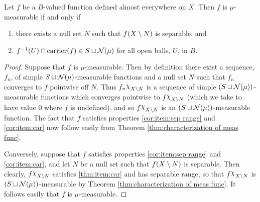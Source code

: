 \begin{corollary}
\label{cor:characterization of meas func}
Let $f$ be a $B$-valued function defined almost everywhere on $X$. Then $f$ is $\mu$-measurable if and only if
\begin{enumerate}[label=\arabic*),ref=\arabic*)]
    \item \label{cor:item:sep range}
    there exists a null set $N$ such that $f(X\setminus N)$ is separable, and
    \item \label{cor:item:car}
    $f^{-1}(U)\cap\operatorname{carrier}(f)\in S\sqcup{\cal N}(\mu)$ for all open balls, $U$, in $B$.
\end{enumerate}
\end{corollary}
\begin{proof}
Suppose that $f$ is $\mu$-measurable. Then by definition there exist a sequence, $f_n$, of simple $S\sqcup{\cal N}(\mu)$-measurable functions and a null set $N$ such that $f_n$ converges to $f$ pointwise off $N$. Thus $f_n\idf{X\sd N}$ is a sequence of simple $(S\sqcup{\cal N}(\mu))$-measurable functions which converges pointwise to $f\idf{X\sd N}$ (which we take to have value 0 where $f$ is undefined), and so $f\idf{X\sd N}$ is an $(S\sqcup{\cal N}(\mu))$-measurable function. The fact that $f$ satisfies properties \ref{cor:item:sep range} and \ref{cor:item:car} now follow easily from Theorem \ref{thm:characterization of meas func}.

Conversely, suppose that $f$ satisfies properties \ref{cor:item:sep range} and \ref{cor:item:car}, and let $N$ be a null set such that $f(X\setminus N)$ is separable. Then clearly, $f\idf{X\sd N}$ satisfies \ref{thm:item:car} and has separable range, so that $f\idf{X\sd N}$ is $(S\sqcup{\cal N}(\mu))$-measurable by Theorem \ref{thm:characterization of meas func}. It follows easily that $f$ is $\mu$-measurable.
\end{proof}

